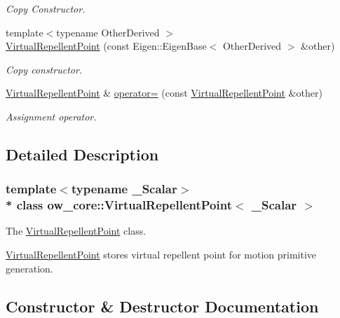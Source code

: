 \begin{DoxyCompactItemize}
\begin{DoxyCompactList}\small\item\em Copy Constructor. \end{DoxyCompactList}\item 
{\footnotesize template$<$typename Other\+Derived $>$ }\\\hyperlink{classow__core_1_1VirtualRepellentPoint_a43194c6854eb6f1d58cb51e3854011da}{Virtual\+Repellent\+Point} (const Eigen\+::\+Eigen\+Base$<$ Other\+Derived $>$ \&other)
\begin{DoxyCompactList}\small\item\em Copy constructor. \end{DoxyCompactList}\item 
\hyperlink{classow__core_1_1VirtualRepellentPoint}{Virtual\+Repellent\+Point} \& \hyperlink{classow__core_1_1VirtualRepellentPoint_a2f6e0237f199ac8baf65fb5ed450ccf5}{operator=} (const \hyperlink{classow__core_1_1VirtualRepellentPoint}{Virtual\+Repellent\+Point} \&other)\hypertarget{classow__core_1_1VirtualRepellentPoint_a2f6e0237f199ac8baf65fb5ed450ccf5}{}\label{classow__core_1_1VirtualRepellentPoint_a2f6e0237f199ac8baf65fb5ed450ccf5}

\begin{DoxyCompactList}\small\item\em Assignment operator. \end{DoxyCompactList}\end{DoxyCompactItemize}


\subsection{Detailed Description}
\subsubsection*{template$<$typename \+\_\+\+Scalar$>$\\*
class ow\+\_\+core\+::\+Virtual\+Repellent\+Point$<$ \+\_\+\+Scalar $>$}

The \hyperlink{classow__core_1_1VirtualRepellentPoint}{Virtual\+Repellent\+Point} class. 

\hyperlink{classow__core_1_1VirtualRepellentPoint}{Virtual\+Repellent\+Point} stores virtual repellent point for motion primitive generation. 

\subsection{Constructor \& Destructor Documentation}
